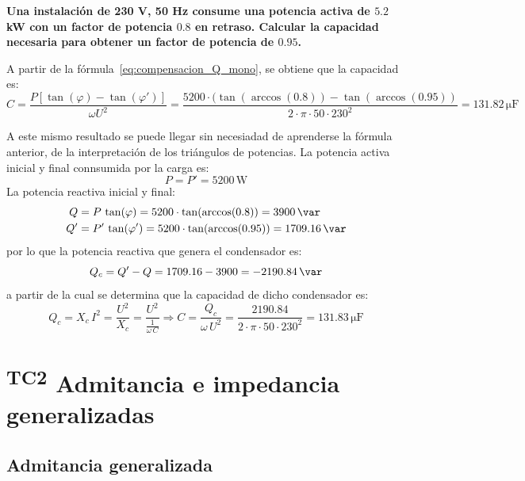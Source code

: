 \begin{example}\label{ex.condensador_Q}
  \textbf{Una instalación de 230 V, 50 Hz consume una potencia activa
    de $5.2$ kW con un factor de potencia $0.8$ en retraso. Calcular
    la capacidad necesaria para obtener un factor de potencia de
    $0.95$.}
	    
  A partir de la fórmula~\eqref{eq:compensacion_Q_mono}, se obtiene
  que la capacidad es:
  \begin{equation*}
    C=\frac{P \left[\tan (\varphi) - \tan (\varphi')\right]}{\omega U^2}=\dfrac{5200\cdot(\tan(\arccos(0.8))-\tan(\arccos(0.95))}{2\cdot\pi\cdot 50\cdot 230^2}=131.82\,\si{\micro\farad}
  \end{equation*}
	    
  A este mismo resultado se puede llegar sin necesiadad de aprenderse
  la fórmula anterior, de la interpretación de los triángulos de
  potencias. La potencia activa inicial y final connsumida por la
  carga es:
  \begin{equation*}
    P=P'=5200\,\si{\watt}
  \end{equation*}
  La potencia reactiva inicial y final:
  \begin{align*}
    Q&=P\,\tan(\varphi)=5200\cdot\tan(\arccos(0.8))=3900\,\si{\var}\\
    Q'&=P'\,\tan(\varphi')=5200\cdot\tan(\arccos(0.95))=1709.16\,\si{\var}
  \end{align*}
  por lo que la potencia reactiva que genera el condensador es:
  \begin{equation*}
    Q_c=Q'-Q=1709.16-3900=-2190.84\,\si{\var}
  \end{equation*}
  a partir de la cual se determina que la capacidad de dicho
  condensador es:
  \begin{equation*}
    Q_c=X_c\,I^2=\dfrac{U^2}{X_c}=\dfrac{U^2}{\frac{1}{\omega\,C}}\Rightarrow C=\dfrac{Q_c}{\omega\,U^2}=\dfrac{2190.84}{2\cdot\pi\cdot 50\cdot 230^2}=131.83\,\si{\micro\farad}
  \end{equation*}
\end{example}
	
\section{\textsuperscript{TC2} Admitancia e impedancia generalizadas}
\label{sec:admitancia-impedancia-generalizada}

\subsection{Admitancia generalizada}
\label{sec:admitancia-generalizada}

